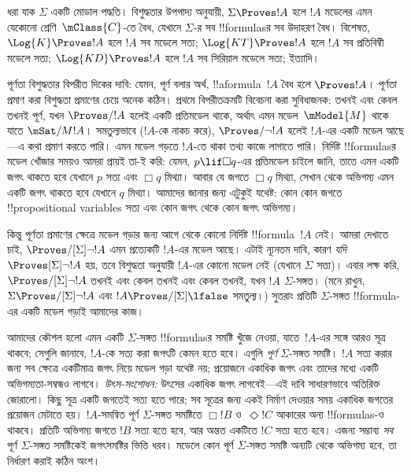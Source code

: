 \documentclass[../../../include/open-logic-section]{subfiles}
\begin{document}


ধরা যাক $\Sigma$ একটি মোডাল পদ্ধতি। বিশুদ্ধতার উপপাদ্য অনুযায়ী, $\Sigma \Proves !A$ হলে $!A$ মডেলের এমন যেকোনো শ্রেণি~$\mClass{C}$-তে বৈধ, যেখানে $\Sigma$-র সব !!{formula}sর সব উদাহরণ বৈধ। বিশেষত, $\Log{K} \Proves !A$ হলে $!A$ সব মডেলে সত্য; $\Log{KT} \Proves !A$ হলে $!A$ সব প্রতিবিম্বী মডেলে সত্য; $\Log{KD} \Proves !A$ হলে $!A$ সব সিরিয়াল মডেলে সত্য; ইত্যাদি।

পূর্ণতা বিশুদ্ধতার বিপরীত দিকের দাবি: যেমন,  পূর্ণ বলার অর্থ, !!a{formula}~$!A$ বৈধ হলে $\Proves !A$। পূর্ণতা প্রমাণ করা বিশুদ্ধতা প্রমাণের চেয়ে অনেক কঠিন। প্রথমে বিপরীতক্রমটি বিবেচনা করা সুবিধাজনক:  তখনই এবং কেবল তখনই পূর্ণ, যখন $\Proves/ !A$ হলেই একটি প্রতিমডেল থাকে, অর্থাৎ এমন মডেল~$\mModel{M}$ থাকে যাতে $\mSat/{M}{!A}$। সমতুল্যভাবে ($!A$-কে নাকচ করে), $\Proves/ \lnot !A$ হলেই $!A$-এর একটি মডেল আছে—এ কথা প্রমাণ করতে পারি। এমন মডেল গড়তে $!A$-তে থাকা তথ্য কাজে লাগাতে পারি। নির্দিষ্ট !!{formula}sর মডেল খোঁজার সময়ও আমরা প্রায়ই তা-ই করি: যেমন, $p \lif \Box q$-এর প্রতিমডেল চাইলে জানি, তাতে এমন একটি জগৎ থাকতে হবে যেখানে $p$ সত্য এবং $\Box q$ মিথ্যা। আবার যে জগতে $\Box q$ মিথ্যা, সেখান থেকে অভিগম্য এমন একটি জগৎ থাকতে হবে যেখানে $q$ মিথ্যা। আমাদের জানার জন্য এটুকুই যথেষ্ট: কোন কোন জগতে !!{propositional variable}s সত্য এবং কোন জগৎ থেকে কোন জগৎ অভিগম্য।

কিন্তু পূর্ণতা প্রমাণের ক্ষেত্রে মডেল গড়ার জন্য আগে থেকে কোনো নির্দিষ্ট !!{formula}~$!A$ নেই। আমরা দেখাতে চাই, $\Proves/[\Sigma] \lnot !A$ এমন প্রত্যেকটি $!A$-এর মডেল আছে। এটাই ন্যূনতম দাবি, কারণ \emph{যদি} $\Proves[\Sigma] \lnot !A$ হয়, তবে বিশুদ্ধতা অনুযায়ী $!A$-এর কোনো মডেল নেই (যেখানে $\Sigma$ সত্য)। এবার লক্ষ করি, $\Proves/[\Sigma] \lnot !A$ তখনই এবং কেবল তখনই এবং কেবল তখনই, যখন $!A$ $\Sigma$-সঙ্গত। (মনে রাখুন, $\Sigma \Proves/[\Sigma] \lnot !A$ এবং $!A \Proves/[\Sigma] \lfalse$ সমতুল্য।) সুতরাং প্রতিটি $\Sigma$-সঙ্গত !!{formula}-এর একটি মডেল গড়াই আমাদের কাজ।

আমাদের কৌশল হলো এমন একটি $\Sigma$-সঙ্গত !!{formula}sর সমষ্টি খুঁজে নেওয়া, যাতে~$!A$-এর সঙ্গে আরও সূত্র থাকবে; সেগুলি জানাবে, $!A$-কে সত্য করা জগৎটি কেমন হতে হবে। এগুলি \emph{পূর্ণ} $\Sigma$-সঙ্গত সমষ্টি। $!A$ সত্য করার জন্য সব ক্ষেত্রে একটিমাত্র জগৎ নিয়ে মডেল গড়া যথেষ্ট নয়; প্রয়োজনে একাধিক জগৎ এবং তাদের মধ্যে একটি অভিগম্যতা-সম্বন্ধও লাগবে।
\emph{উৎস-সংশোধন:} উৎসের একাধিক জগৎ লাগবেই—এই দাবি সাধারণভাবে অতিরিক্ত জোরালো। কিছু সূত্র একটি জগতেই সত্য হতে পারে; সব সূত্রের জন্য একই নির্মাণ দেওয়ার সময় একাধিক জগতের প্রয়োজন মেটাতে হয়।
$!A$-সমন্বিত পূর্ণ $\Sigma$-সঙ্গত সমষ্টিতে $\Box !B$ ও~$\Diamond !C$ আকারের অন্য !!{formula}s-ও থাকবে। প্রতিটি অভিগম্য জগতে $!B$ সত্য হতে হবে, আর অন্তত একটিতে $!C$ সত্য হতে হবে। এজন্য সম্ভাব্য \emph{সব} পূর্ণ $\Sigma$-সঙ্গত সমষ্টিকেই জগৎসমষ্টির ভিত্তি ধরব। মডেলে কোন পূর্ণ $\Sigma$-সঙ্গত সমষ্টি অন্যটি থেকে অভিগম্য হবে, তা নির্ধারণ করাই কঠিন অংশ।
\end{document}
